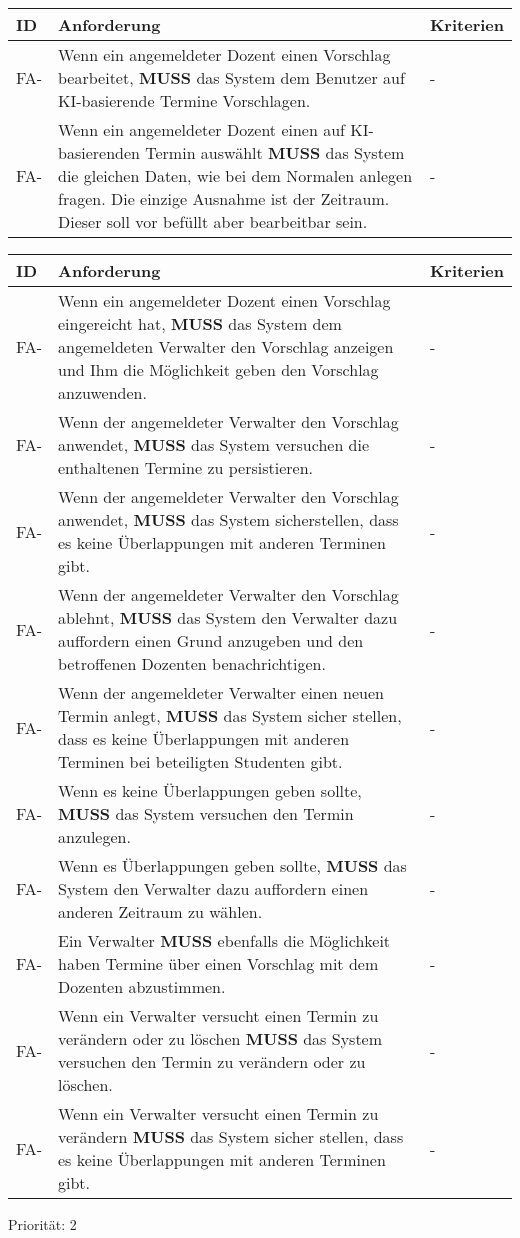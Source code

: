 \newpage

\begin{tabular} {|p{}|p{11cm}|p{}|}
	\hline
	ID & Anforderung & Kriterien \\
	\hline
	FA-
	& Wenn ein angemeldeter Dozent einen Vorschlag bearbeitet, \textbf{MUSS} das System dem Benutzer auf KI-basierende Termine Vorschlagen. 
	& - \\
	\hline
	FA-
	& Wenn ein angemeldeter Dozent einen auf KI-basierenden Termin auswählt \textbf{MUSS} das System die gleichen Daten, wie bei dem Normalen anlegen fragen. Die einzige Ausnahme ist der Zeitraum. Dieser soll vor befüllt aber bearbeitbar sein. 
	& - \\
	\hline
\end{tabular}

\begin{tabular} {|p{}|p{11cm}|p{}|}
	\hline
	ID & Anforderung & Kriterien \\
	\hline
	FA-
	& Wenn ein angemeldeter Dozent einen Vorschlag eingereicht hat, \textbf{MUSS} das System dem angemeldeten Verwalter den Vorschlag anzeigen und Ihm die Möglichkeit geben den Vorschlag anzuwenden. 
	& - \\
	\hline
	FA-
	& Wenn der angemeldeter Verwalter den Vorschlag anwendet, \textbf{MUSS} das System versuchen die enthaltenen Termine zu persistieren.
	& - \\
	\hline
	FA-
	& Wenn der angemeldeter Verwalter den Vorschlag anwendet, \textbf{MUSS} das System sicherstellen, dass es keine Überlappungen mit anderen Terminen gibt.
	& - \\
	\hline
	FA-
	& Wenn der angemeldeter Verwalter den Vorschlag ablehnt, \textbf{MUSS} das System den Verwalter dazu auffordern einen Grund anzugeben und den betroffenen Dozenten benachrichtigen.
	& - \\
	\hline
	FA-
	& Wenn der angemeldeter Verwalter einen neuen Termin anlegt, \textbf{MUSS} das System sicher stellen, dass es keine Überlappungen mit anderen Terminen bei beteiligten Studenten gibt.
	& - \\
	\hline
	FA-
	& Wenn es keine Überlappungen geben sollte, \textbf{MUSS} das System versuchen den Termin anzulegen.
	& - \\
	\hline
	FA-
	& Wenn es Überlappungen geben sollte, \textbf{MUSS} das System den Verwalter dazu auffordern einen anderen Zeitraum zu wählen.
	& - \\
	\hline
	FA-
	& Ein Verwalter \textbf{MUSS} ebenfalls die Möglichkeit haben Termine über einen Vorschlag mit dem Dozenten abzustimmen.
	& - \\
	\hline
	FA-
	& Wenn ein Verwalter versucht einen Termin zu verändern oder zu löschen \textbf{MUSS} das System versuchen den Termin zu verändern oder zu löschen.
	& - \\
	\hline
	FA-
	& Wenn ein Verwalter versucht einen Termin zu verändern \textbf{MUSS} das System sicher stellen, dass es keine Überlappungen mit anderen Terminen gibt.
	& - \\
	\hline
\end{tabular}
Priorität: 2

